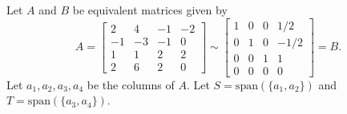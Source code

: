 \documentclass[addpoints]{exam}
\newcommand{\spn}{\mathrm{span}}
\newcommand{\nll}{\mathrm{null}}
\begin{document}
\begin{questions}
    \newpage

    \question
    Let $A$ and $B$ be equivalent matrices given by
    \[
        A =
        \begin{bmatrix}
            2 & 4 & -1 & -2 \\
            -1 & -3 & -1 & 0 \\
            1 & 1 & 2 & 2 \\
            2 & 6 & 2 & 0
        \end{bmatrix}
        \sim
        \begin{bmatrix}
            1 & 0 & 0 & 1/2 \\
            0 & 1 & 0 & -1/2 \\
            0 & 0 & 1 & 1 \\
            0 & 0 & 0 & 0
        \end{bmatrix}
        = B.
    \]
    Let $a_1,a_2,a_3,a_4$ be the columns of $A$. Let $S=\spn(\{a_1,a_2\})$ and
    $T=\spn(\{a_3,a_4\})$.

\end{questions}
\end{document}
